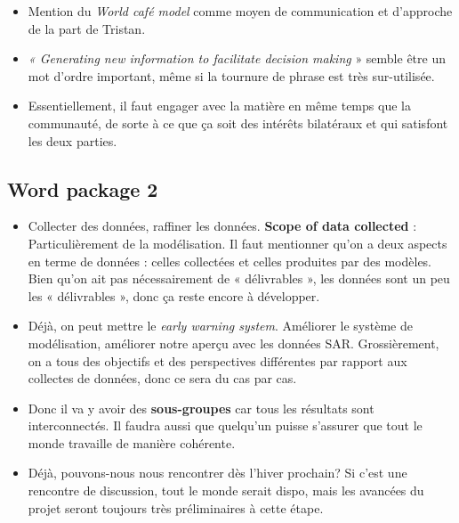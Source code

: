\documentclass[10pt]{article}
\numberwithin{equation}{section}
\begin{document}
\begin{itemize}
\item Mention du \emph{World café model} comme moyen de communication et d'approche de la part de Tristan.
\item \emph{« Generating new information to facilitate decision making} » semble être un mot d'ordre important, même si la tournure de phrase est très sur-utilisée.
\item Essentiellement, il faut engager avec la matière en même temps que la communauté, de sorte à ce que ça soit des intérêts bilatéraux et qui satisfont les deux parties.
\end{itemize}
\subsection{Word package 2}
\label{sec:orgc2c9b4c}

\begin{itemize}
\item Collecter des données, raffiner les données. \textbf{Scope of data collected} : Particulièrement de la modélisation. Il faut mentionner qu'on a deux aspects en terme de données : celles collectées et celles produites par des modèles. Bien qu'on ait pas nécessairement de « délivrables », les données sont un peu les « délivrables », donc ça reste encore à développer.

\item Déjà, on peut mettre le \emph{early warning system}. Améliorer le système de modélisation, améliorer notre aperçu avec les données SAR. Grossièrement, on a tous des objectifs et des perspectives différentes par rapport aux collectes de données, donc ce sera du cas par cas.

\item Donc il va y avoir des \textbf{sous-groupes} car tous les résultats sont interconnectés. Il faudra aussi que quelqu'un puisse s'assurer que tout le monde travaille de manière cohérente.

\item Déjà, pouvons-nous nous rencontrer dès l'hiver prochain? Si c'est une rencontre de discussion, tout le monde serait dispo, mais les avancées du projet seront toujours très préliminaires à cette étape.
\end{itemize}
\end{document}
